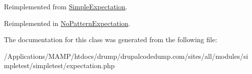 Reimplemented from \hyperlink{class_simple_expectation_a15b69edf659c76f6543aa98d8d85b025}{SimpleExpectation}.

Reimplemented in \hyperlink{class_no_pattern_expectation_a214eefe693fa189648ee4e51d38ed7b2}{NoPatternExpectation}.

The documentation for this class was generated from the following file:\begin{DoxyCompactItemize}
\item 
/Applications/MAMP/htdocs/drump/drupalcodedump.com/sites/all/modules/simpletest/simpletest/expectation.php\end{DoxyCompactItemize}
